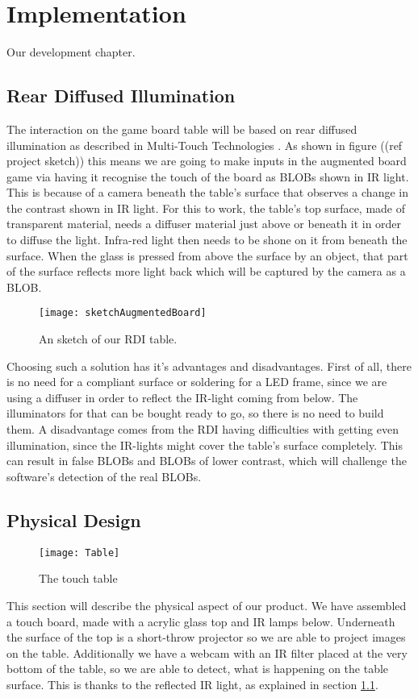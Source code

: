 \chapter{Implementation}\label{ch:implementation}
Our development chapter. 

\section{Rear Diffused Illumination} \label{sec:RDI}
The interaction on the game board table will be based on rear diffused illumination as described in Multi-Touch Technologies \citep{multiTT}. As shown in figure ((ref project sketch)) this means we are going to make inputs in the augmented board game via having it recognise the touch of the board as BLOBs shown in IR light. This is because of a camera beneath the table's surface that observes a change in the contrast shown in IR light. 
For this to work, the table's top surface, made of transparent material, needs a diffuser material just above or beneath it in order to diffuse the light. Infra-red light then needs to be shone on it from beneath the surface. When the glass is pressed from above the surface by an object, that part of the surface reflects more light back which will be captured by the camera as a BLOB.
\begin{figure}[!h]
\centering	\texttt{[image: sketchAugmentedBoard]}
\label{Fig:sketch} \caption{An sketch of our RDI table.}
\end{figure}

Choosing such a solution has it's advantages and disadvantages. First of all, there is no need for a compliant surface or soldering for a LED frame, since we are using a diffuser in order to reflect the IR-light coming from below. The illuminators for that can be bought ready to go, so there is no need to build them. A disadvantage comes from the RDI having difficulties with getting even illumination, since the IR-lights might cover the table's surface completely. This can result in false BLOBs and BLOBs of lower contrast, which will challenge the software's detection of the real BLOBs.

\section{Physical Design} 
\begin{figure} [!h]
\centering \texttt{[image: Table]}
\label{Fig:Table} \caption{The touch table}
\end{figure}
This section will describe the physical aspect of our product.
We have assembled a touch board, made with a acrylic glass top and IR lamps below. Underneath the surface of the top is a short-throw projector so we are able to project images on the table. Additionally we have a webcam with an IR filter placed at the very bottom of the table, so we are able to detect, what is happening on the table surface. This is thanks to the reflected IR light, as explained in section \ref{sec:RDI}.

